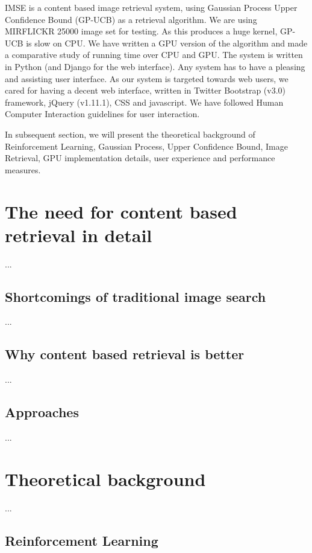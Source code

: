 \documentclass[english]{tktltiki}
\begin{document}
IMSE is a content based image retrieval system, using Gaussian Process Upper Confidence Bound (GP-UCB) as a retrieval algorithm. We are using MIRFLICKR 25000 image set for testing. As this produces a huge kernel, GP-UCB is slow on CPU. We have written a GPU version of the algorithm and made a comparative study of running time over CPU and GPU. The system is written in Python (and Django for the web interface). Any system has to have a pleasing and assisting user interface. As our system is targeted towards web users, we cared for having a decent web interface, written in Twitter Bootstrap (v3.0) framework, jQuery (v1.11.1), CSS and javascript. We have followed Human Computer Interaction guidelines for user interaction.

In subsequent section, we will present the theoretical background of Reinforcement Learning, Gaussian Process, Upper Confidence Bound, Image Retrieval, GPU implementation details, user experience and performance measures.


\section{The need for content based retrieval in detail}

...

\subsection{Shortcomings of traditional image search}

...

\subsection{Why content based retrieval is better}


...


\subsection{Approaches}

...


\section{Theoretical background}

...


\subsection{Reinforcement Learning}
\end{document}
